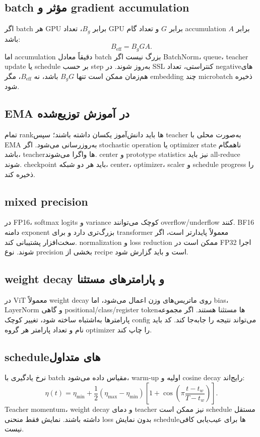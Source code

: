 \documentclass[12pt,openany,oneside]{book}
\begin{document}
\subsection{batch مؤثر و gradient accumulation}
اگر batch هر GPU برابر $B_g$، تعداد GPU برابر $G$ و تعداد گام accumulation برابر $A$ باشد:
\begin{equation}
B_{\mathrm{eff}}=B_gGA.
\end{equation}
اما accumulation دقیقاً معادل batch بزرگ نیست اگر BatchNorm، queue، teacher update یا schedule بر حسب step به‌روز شوند. در SSL کنتراستی، تعداد negativeهای هم‌زمان ممکن است تنها $B_gG$ باشد، نه $B_{\mathrm{eff}}$، مگر embedding چند microbatch ذخیره شود.

\subsection{EMA در آموزش توزیع‌شده}
تمام rankها باید دانش‌آموز یکسان داشته باشند؛ سپس teacher به‌صورت محلی با EMA به‌روزرسانی می‌شود. اگر stochastic operation یا optimizer state ناهمگام باشد، teacherها واگرا می‌شوند. center و prototype statistics نیز باید all-reduce شوند. checkpoint باید هر دو شبکه، center، optimizer، scaler و schedule progress را ذخیره کند.

\subsection{mixed precision}
در FP16، softmax logits و variance کوچک می‌توانند overflow/underflow کنند. BF16 دامنه exponent بزرگ‌تری دارد و برای transformer معمولاً پایدارتر است، اگر سخت‌افزار پشتیبانی کند. normalization و loss reduction ممکن است در FP32 اجرا شوند. نوع precision بخشی از recipe است و باید گزارش شود.

\subsection{weight decay و پارامترهای مستثنا}
در ViT معمولاً weight decay روی ماتریس‌های وزن اعمال می‌شود، اما bias، LayerNorm و گاهی positional/class/register tokenها مستثنا هستند. اگر مجموعه پارامترها به‌اشتباه ساخته شود، تغییر کوچک config می‌تواند نتیجه را جابه‌جا کند. کد باید نام و تعداد پارامتر هر گروه optimizer را چاپ کند.

\subsection{scheduleهای متداول}
نرخ یادگیری با batch مقیاس داده می‌شود، warm-up اولیه و cosine decay رایج‌اند:
\begin{equation}
\eta(t)=\eta_{\min}+\frac{1}{2}(\eta_{\max}-\eta_{\min})
\left[1+\cos\left(\pi\frac{t-t_w}{T-t_w}\right)\right].
\end{equation}
Teacher momentum، weight decay و دمای teacher نیز ممکن است schedule مستقل داشته باشند. نمایش فقط منحنی loss بدون نمایش scheduleها برای عیب‌یابی کافی نیست.
\end{document}
